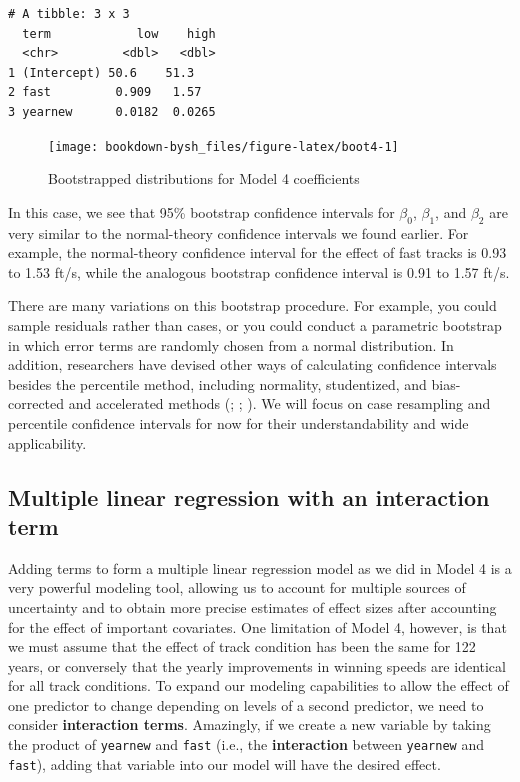\documentclass[
]{krantz}
\begin{document}
\begin{verbatim}
# A tibble: 3 x 3
  term            low    high
  <chr>         <dbl>   <dbl>
1 (Intercept) 50.6    51.3   
2 fast         0.909   1.57  
3 yearnew      0.0182  0.0265
\end{verbatim}

\begin{figure}

{\centering \texttt{[image: bookdown-bysh\_files/figure-latex/boot4-1]} 

}

\caption{Bootstrapped distributions for Model 4 coefficients}\label{fig:boot4}
\end{figure}

In this case, we see that 95\% bootstrap confidence intervals for \(\beta_0\), \(\beta_1\), and \(\beta_2\) are very similar to the normal-theory confidence intervals we found earlier. For example, the normal-theory confidence interval for the effect of fast tracks is 0.93 to 1.53 ft/s, while the analogous bootstrap confidence interval is 0.91 to 1.57 ft/s.

There are many variations on this bootstrap procedure. For example, you could sample residuals rather than cases, or you could conduct a parametric bootstrap in which error terms are randomly chosen from a normal distribution. In addition, researchers have devised other ways of calculating confidence intervals besides the percentile method, including normality, studentized, and bias-corrected and accelerated methods (\citet{Hesterberg2015}; \citet{Efron1993}; \citet{Davison1997}). We will focus on case resampling and percentile confidence intervals for now for their understandability and wide applicability.

\hypertarget{multiple-linear-regression-with-an-interaction-term}{%
\subsection{Multiple linear regression with an interaction term}\label{multiple-linear-regression-with-an-interaction-term}}

Adding terms to form a multiple linear regression model as we did in Model 4 is a very powerful modeling tool, allowing us to account for multiple sources of uncertainty and to obtain more precise estimates of effect sizes after accounting for the effect of important covariates. One limitation of Model 4, however, is that we must assume that the effect of track condition has been the same for 122 years, or conversely that the yearly improvements in winning speeds are identical for all track conditions. To expand our modeling capabilities to allow the effect of one predictor to change depending on levels of a second predictor, we need to consider \textbf{interaction terms}.  Amazingly, if we create a new variable by taking the product of \texttt{yearnew} and \texttt{fast} (i.e., the \textbf{interaction} between \texttt{yearnew} and \texttt{fast}), adding that variable into our model will have the desired effect.
\end{document}
